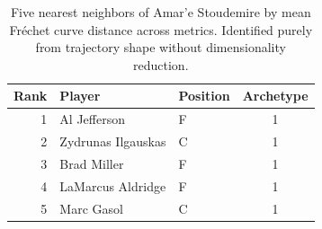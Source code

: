 \begin{table}[htbp]
  \centering\small
  \begin{tabular}{rllc}
    \toprule
    Rank & Player & Position & Archetype \\
    \midrule
    1 & Al Jefferson & F & 1 \\
    2 & Zydrunas Ilgauskas & C & 1 \\
    3 & Brad Miller & F & 1 \\
    4 & LaMarcus Aldridge & F & 1 \\
    5 & Marc Gasol & C & 1 \\
    \bottomrule
  \end{tabular}
  \caption{Five nearest neighbors of Amar'e Stoudemire by mean Fr\'{e}chet curve distance across metrics. Identified purely from trajectory shape without dimensionality reduction.}
  \label{tab:Amar_e_Stoudemire_frechet_curve_neighbors}
\end{table}

